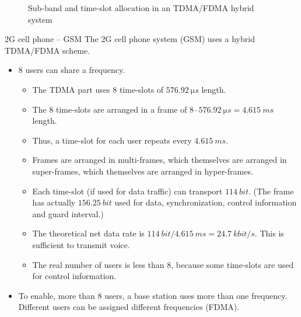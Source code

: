 \begin{refsection}
\begin{figure}[H]
	\centering
	\caption{Sub-band and time-slot allocation in an \acs{TDMA}/\acs{FDMA} hybrid system}
\end{figure}

\begin{example}{2G cell phone -- \acs{GSM}}
	The 2G cell phone system (\acf{GSM}) uses a hybrid \acs{TDMA}/\acs{FDMA} scheme.
	\begin{itemize}
		\item 8 users can share a frequency.
		\begin{itemize}
			\item The \acs{TDMA} part uses 8 time-slots of $\SI{576.92}{\micro{}s}$ length.
			\item The 8 time-slots are arranged in a frame of $8 \cdot \SI{576.92}{\micro{}s} = \SI{4.615}{ms}$ length.
			\item Thus, a time-slot for each user repeats every $\SI{4.615}{ms}$.
			\item Frames are arranged in multi-frames, which themselves are arranged in super-frames, which themselves are arranged in hyper-frames.
			\item Each time-slot (if used for data traffic) can transport $\SI{114}{bit}$. (The frame has actually $\SI{156.25}{bit}$ used for data, synchronization, control information and guard interval.)
			\item The theoretical net data rate is $\SI{114}{bit} / \SI{4.615}{ms} = \SI{24.7}{kbit/s}$. This is sufficient to transmit voice.
			\item The real number of users is less than 8, because some time-slots are used for control information.
		\end{itemize}
		\item To enable, more than 8 users, a base station uses more than one frequency. Different users can be assigned different frequencies (\acs{FDMA}).
	\end{itemize}
\end{example}


\end{refsection}
